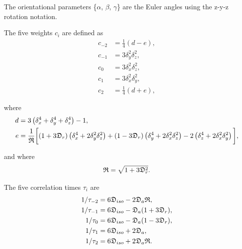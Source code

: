 \begin{htmlonly}
\begin{htmlonly}
\noindent The orientational parameters \{$\alpha$, $\beta$, $\gamma$\} are the Euler angles using the z-y-z rotation notation.


The five weights $c_i$ are defined as
\begin{subequations}
\begin{align}
    c_{-2} &= \tfrac{1}{4}(d - e),     \label{eq: ellipsoid c-2} \\
    c_{-1} &= 3\delta_y^2\delta_z^2,   \label{eq: ellipsoid c-1} \\
    c_{0}  &= 3\delta_x^2\delta_z^2,   \label{eq: ellipsoid c0} \\
    c_{1}  &= 3\delta_x^2\delta_y^2,   \label{eq: ellipsoid c1} \\
    c_{2}  &= \tfrac{1}{4}(d + e),     \label{eq: ellipsoid c2}
\end{align}
\end{subequations}

\noindent where
\begin{align}
    d &= 3 \left( \delta_x^4 + \delta_y^4 + \delta_z^4 \right) - 1, \label{eq: ellipsoid d} \\
    e &= \frac{1}{\mathfrak{R}} \bigg[ (1 + 3\mathfrak{D}_r) \left(\delta_x^4 + 2\delta_y^2\delta_z^2\right)
        + (1 - 3\mathfrak{D}_r) \left(\delta_y^4 + 2\delta_x^2\delta_z^2\right) - 2 \left(\delta_z^4 + 2\delta_x^2\delta_y^2\right) \bigg], \label{eq: ellipsoid e}
\end{align}

\noindent and where
\begin{equation}
    \mathfrak{R} = \sqrt{1 + 3\mathfrak{D}_r^2}.
\end{equation}


The five correlation times $\tau_i$ are
\begin{subequations}
\begin{align}
    1/\tau_{-2} &= 6 \mathfrak{D}_{iso} - 2\mathfrak{D}_a\mathfrak{R},   \label{eq: ellipsoid tau-2} \\
    1/\tau_{-1} &= 6 \mathfrak{D}_{iso} - \mathfrak{D}_a (1 + 3\mathfrak{D}_r), \label{eq: ellipsoid tau-1} \\
    1/\tau_{0}  &= 6 \mathfrak{D}_{iso} - \mathfrak{D}_a (1 - 3\mathfrak{D}_r), \label{eq: ellipsoid tau0} \\
    1/\tau_{1}  &= 6 \mathfrak{D}_{iso} + 2\mathfrak{D}_a,               \label{eq: ellipsoid tau1} \\
    1/\tau_{2}  &= 6 \mathfrak{D}_{iso} + 2\mathfrak{D}_a\mathfrak{R}.   \label{eq: ellipsoid tau2}
\end{align}
\end{subequations}




\end{htmlonly}
\end{htmlonly}
